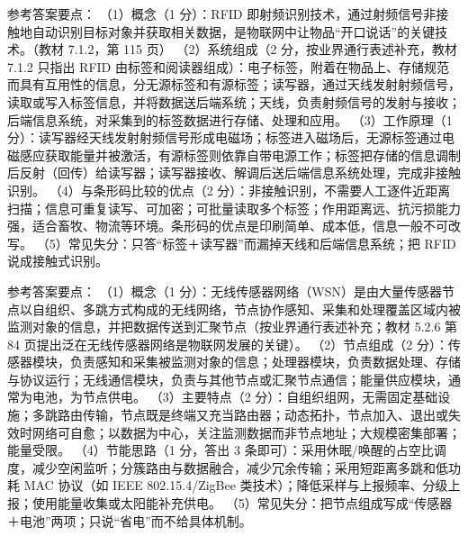 \documentclass[a4paper,11pt]{article}
\begin{document}
\q 参考答案要点：
（1）概念（1 分）：RFID 即射频识别技术，通过射频信号非接触地自动识别目标对象并获取相关数据，是物联网中让物品“开口说话”的关键技术。（教材 7.1.2，第 115 页）
（2）系统组成（2 分，按业界通行表述补充，教材 7.1.2 只指出 RFID 由标签和阅读器组成）：电子标签，附着在物品上、存储规范而具有互用性的信息，分无源标签和有源标签；读写器，通过天线发射射频信号，读取或写入标签信息，并将数据送后端系统；天线，负责射频信号的发射与接收；后端信息系统，对采集到的标签数据进行存储、处理和应用。
（3）工作原理（1 分）：读写器经天线发射射频信号形成电磁场；标签进入磁场后，无源标签通过电磁感应获取能量并被激活，有源标签则依靠自带电源工作；标签把存储的信息调制后反射（回传）给读写器；读写器接收、解调后送后端信息系统处理，完成非接触识别。
（4）与条形码比较的优点（2 分）：非接触识别，不需要人工逐件近距离扫描；信息可重复读写、可加密；可批量读取多个标签；作用距离远、抗污损能力强，适合畜牧、物流等环境。条形码的优点是印刷简单、成本低，信息一般不可改写。
（5）常见失分：只答“标签＋读写器”而漏掉天线和后端信息系统；把 RFID 说成接触式识别。

\q 参考答案要点：
（1）概念（1 分）：无线传感器网络（WSN）是由大量传感器节点以自组织、多跳方式构成的无线网络，节点协作感知、采集和处理覆盖区域内被监测对象的信息，并把数据传送到汇聚节点（按业界通行表述补充；教材 5.2.6 第 84 页提出泛在无线传感器网络是物联网发展的关键）。
（2）节点组成（2 分）：传感器模块，负责感知和采集被监测对象的信息；处理器模块，负责数据处理、存储与协议运行；无线通信模块，负责与其他节点或汇聚节点通信；能量供应模块，通常为电池，为节点供电。
（3）主要特点（2 分）：自组织组网，无需固定基础设施；多跳路由传输，节点既是终端又充当路由器；动态拓扑，节点加入、退出或失效时网络可自愈；以数据为中心，关注监测数据而非节点地址；大规模密集部署；能量受限。
（4）节能思路（1 分，答出 3 条即可）：采用休眠/唤醒的占空比调度，减少空闲监听；分簇路由与数据融合，减少冗余传输；采用短距离多跳和低功耗 MAC 协议（如 IEEE 802.15.4/ZigBee 类技术）；降低采样与上报频率、分级上报；使用能量收集或太阳能补充供电。
（5）常见失分：把节点组成写成“传感器＋电池”两项；只说“省电”而不给具体机制。

\end{document}

